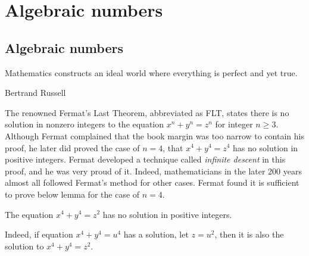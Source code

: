 \documentclass[b5paper]{article}
\begin{document}
\ifx\wholebook\relax
\chapter{Algebraic numbers}
\else
\section{Algebraic numbers}
\fi

\epigraph{Mathematics constructs an ideal world where everything is perfect and yet true.}{Bertrand Russell}

\label{sec:FLT-4} 
The renowned Fermat's Last Theorem, abbreviated as FLT, states there is no solution in nonzero integers to the equation $x^n + y^n = z^n$ for integer $n \geq 3$. Although Fermat complained that the book margin was too narrow to contain his proof, he later did proved the case of $n = 4$, that $x^4 + y^4 = z^4$ has no solution in positive integers. Fermat developed a technique called \emph{infinite descent} in this proof, and he was very proud of it. Indeed, mathematicians in the later 200 years almost all followed Fermat's method for other cases. Fermat found it is sufficient to prove below lemma for the case of $n = 4$.

\begin{lemma}
The equation $x^4 + y^4 = z^2$ has no solution in positive integers.
\end{lemma}

Indeed, if equation $x^4 + y^4 = u^4$ has a solution, let $z = u^2$, then it is also the solution to $x^4 + y^4 = z^2$.
\end{document}
